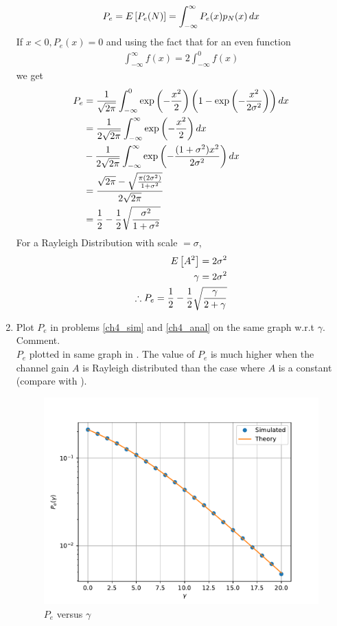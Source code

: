 \begin{enumerate}
\begin{align}
 P_e=E{}\left[P_e(N)\right] = \int_{-\infty}^{\infty}P_e(x)p_{N}(x)\, dx  
\end{align}
If $x<0, P_e(x)=0$ and using the fact that for an even function
\begin{align}
\int_{-\infty}^{\infty}f(x)=2\int_{-\infty}^{0}f(x)   
\end{align}
we get
\begin{align}
  P_e&= \frac{1}{\sqrt{2\pi}}\int_{-\infty}^{0}\exp \left( -\frac{x^2}{2}\right) \left(1-\exp \left( -\frac{x^2}{2\sigma^2}\right) \right) dx\\
&= \frac{1}{2\sqrt{2\pi}} \int_{-\infty}^{\infty} \exp \left( -\frac{x^2}{2} \right)dx \nonumber \\
&- \frac{1}{2\sqrt{2\pi}} \int_{-\infty}^{\infty} \exp \left(-\frac{(1+ \sigma^2)x^2}{2 \sigma^2}\right)  dx\\
&= \frac{\sqrt{2\pi} - \sqrt{\frac{\pi(2\sigma^2)}{1+\sigma^2}}}{2\sqrt{2\pi}}\\
&= \frac{1}{2} - \frac{1}{2}\sqrt{\frac{\sigma^2}{1+\sigma^2}}
\end{align}
For a Rayleigh Distribution with scale $= \sigma$,
\begin{align}
E{}\left[A^2\right] = 2\sigma^2\\
\gamma = 2\sigma^2\\
\therefore P_e = \frac{1}{2} - \frac{1}{2}\sqrt{\frac{\gamma}{2+\gamma}}
\end{align}
%
\item
Plot $P_e$ in problems \ref{ch4_sim} and \ref{ch4_anal} on the same graph w.r.t $\gamma$.  Comment.\\
\solution $P_e$ plotted in same graph in . The value of $P_e$ is much higher when the channel %
gain $A$ is Rayleigh distributed than the case where $A$ is a constant (compare with ).
\begin{figure}[H]
\centering
\includegraphics[scale=0.8]{chapter4/figs/prob_error.pdf}
\caption{$P_e$ versus $\gamma$}
\label{fig:bpsk_pe_snr_rayleigh}
\end{figure}
\end{enumerate}
